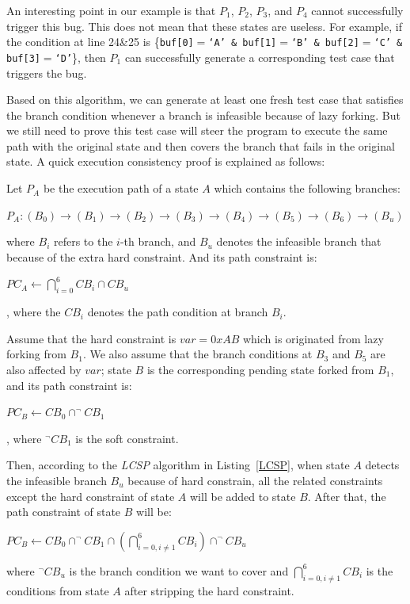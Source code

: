 An interesting point in our example is that $P_1$, $P_2$, $P_3$, and 
$P_4$ cannot successfully trigger this bug. This does not mean that 
these states are useless. 
For example, if the condition at line 24\&25 is 
\{\texttt{buf[0]$=$`A' \& buf[1]$=$`B' \& buf[2]$=$`C' \& buf[3]$=$`D'}\}, 
then $P_1$ can successfully generate a corresponding test case 
that triggers the bug.

Based on this algorithm, we can generate at least one fresh test case 
that satisfies the branch condition whenever a branch is infeasible 
because of lazy forking. But we still need to prove this test case 
will steer the program to execute the same path with the original 
state and then covers the branch that fails in the original state. 
A quick execution consistency proof is explained as follows:

Let $P_A$ be the execution path of a state $A$ which contains 
the following branches:
\begin{center}
$P_A:(B_0) \rightarrow (B_1) \rightarrow (B_2) \rightarrow 
(B_3) \rightarrow (B_4) \rightarrow (B_5) \rightarrow (B_6) \rightarrow (B_u)$
\end{center}

\noindent where $B_i$ refers to the $i$-th branch, and $B_u$ 
denotes the infeasible branch that because of the extra hard constraint.
And its path constraint is:
\begin{center}
$PC_A\leftarrow \displaystyle \bigcap\limits_{i=0}^{6} CB_i \cap CB_u$
\end{center}
, where the $CB_i$ denotes the path condition at branch $B_i$.

Assume that the hard constraint is $var=0xAB$ which is originated 
from lazy forking from $B_1$. 
We also assume that the branch conditions at $B_3$ and $B_5$ are 
also affected by $var$; state $B$ is the corresponding pending state 
forked from $B_1$, and its path constraint is:
\begin{center}
$PC_B\leftarrow\displaystyle CB_0 \cap ^\neg CB_1$
\end{center}
, where $^\neg CB_1$ is the soft constraint.

Then, according to the \textit{LCSP} algorithm in Listing~\ref{LCSP}, 
when state $A$ detects the infeasible branch $B_u$ because of hard 
constrain, all the related constraints except the hard constraint 
of state $A$ will be added to state $B$. After that, the path 
constraint of state $B$ will be:

\begin{center}
$PC_B\leftarrow\displaystyle CB_0 \cap ^\neg CB_1 
\cap (\bigcap\limits_{i=0,i \neq 1}^{6} CB_i) \cap ^\neg CB_u$
\end{center}
where $^\neg CB_u $ is the branch condition we want to cover 
and $\bigcap_{i=0,i \neq 1}^{6} CB_i$ is the conditions from 
state $A$ after stripping the hard constraint.

